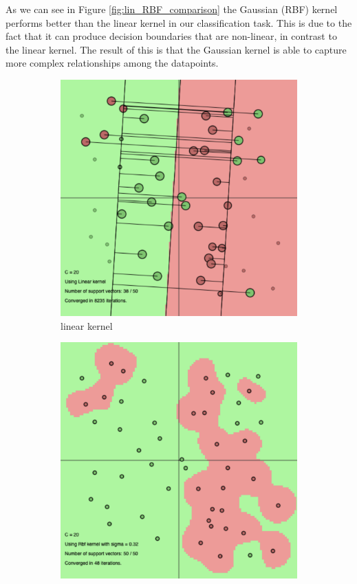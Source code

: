 \documentclass[a4paper, 11pt, one column]{article}
\begin{document}
As we can see in Figure \ref{fig:lin_RBF_comparison} the Gaussian (RBF) kernel performs better than the linear kernel in our classification task. This is due to the fact that it can produce decision boundaries that are non-linear, in contrast to the linear kernel. The result of this is that the Gaussian kernel is able to capture more complex relationships among the datapoints. 

\begin{figure}[]
    \centering
    \begin{subfigure}{0.4\linewidth}
        \includegraphics[width=\linewidth]{images/lin_comp.png}
        \caption{linear kernel}
    \end{subfigure}
    \begin{subfigure}{0.4\linewidth}
        \includegraphics[width=\linewidth]{images/rbf_comp.png}

\end{subfigure}
\end{figure}
\end{document}
